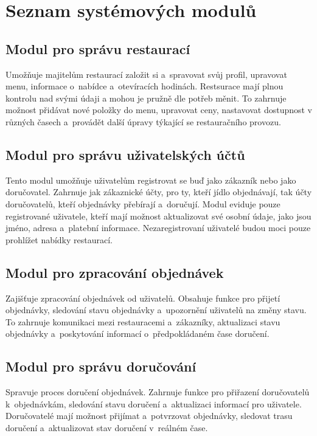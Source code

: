 \section{Seznam systémových modulů}
	\sloppy

	\subsection{Modul pro správu restaurací}

	Umožňuje majitelům restaurací založit si a~spravovat 
	svůj profil, upravovat menu, informace o~nabídce a~otevíracích
	hodinách. Restsurace mají plnou kontrolu nad svými údaji
	a mohou je pružně dle potřeb měnit. 
	To zahrnuje možnost přidávat nové položky do menu, upravovat 
	ceny, nastavovat dostupnost v různých časech a~provádět další úpravy 
	týkající se restauračního provozu.

	\subsection{Modul pro správu uživatelských účtů}

	Tento modul umožňuje uživatelům registrovat se buď jako zákazník nebo 
	jako doručovatel. Zahrnuje jak zákaznické účty, pro ty, kteří jídlo 
	objednávají, tak účty doručovatelů, kteří objednávky přebírají a~doručují.
	Modul eviduje pouze registrované uživatele, kteří mají 
	možnost aktualizovat své osobní údaje, jako jsou jméno, adresa a~platební 
	informace. Nezaregistrovaní uživatelé budou moci pouze 
	prohlížet nabídky restaurací.
	
	\subsection{Modul pro zpracování objednávek}

	Zajišťuje zpracování objednávek od uživatelů. Obsahuje 
	funkce pro přijetí objednávky, sledování stavu objednávky a~upozornění 
	uživatelů na změny stavu. To zahrnuje komunikaci mezi 
	restauracemi a~zákazníky, aktualizaci stavu objednávky a~poskytování 
	informací o~předpokládaném čase doručení.

	\subsection{Modul pro správu doručování}

	Spravuje proces doručení objednávek. Zahrnuje funkce pro 
	přiřazení doručovatelů k~objednávkám, sledování stavu doručení a~aktualizaci
	informací pro uživatele. Doručovatelé mají možnost 
	přijímat a~potvrzovat objednávky, sledovat trasu doručení a~aktualizovat 
	stav doručení v~reálném čase.

